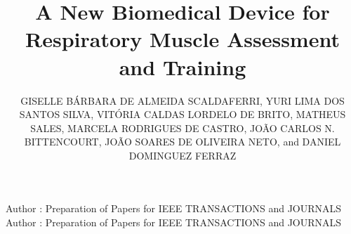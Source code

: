 \documentclass{ieeeaccess}
\begin{document}

\title{A New Biomedical Device for Respiratory Muscle Assessment and Training}


\author{\uppercase{Giselle B\'arbara de Almeida Scaldaferri},
\uppercase{Yuri Lima dos Santos Silva},
\uppercase{Vit\'oria Caldas Lordelo de Brito},
\uppercase{Matheus Sales},
\uppercase{Marcela Rodrigues de Castro},
\uppercase{Jo\~ao Carlos N. Bittencourt},
\uppercase{Jo\~ao Soares de Oliveira Neto}, and
\uppercase{Daniel Dominguez Ferraz}}

\address[1]{Department of Physical Therapy, Multidisciplinary Institute of Rehabilitation and Health, Federal University of Bahia, Salvador, Bahia, Brazil (e-mail: danieldf@ufba.br)}

\address[2]{Center of Exact and Technological Sciences, Federal University of Recôncavo da Bahia, Cruz das Almas, Brazil}

\address[3]{Center for Studies in Older Adult Health and Neurosciences, Multidisciplinary Institute of Rehabilitation and Health, Federal University of Bahia, Salvador, Bahia, Brazil}

\address[4]{Department of Physical Education, School of Education, Federal University of Bahia, Salvador, Bahia, Brazil}

\address[5]{Department of Science, Technology, and Innovation, Institute of Science, Technology, and Innovation, Federal University of Bahia, Brazil}


\markboth
{Author \headeretal: Preparation of Papers for IEEE TRANSACTIONS and JOURNALS}
{Author \headeretal: Preparation of Papers for IEEE TRANSACTIONS and JOURNALS}
\end{document}
